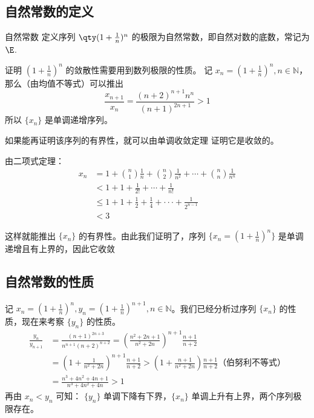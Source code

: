 

\subsection{自然常数的定义}
\begin{definition}{自然常数}
定义序列 $\qty(1+\frac{1}{n})^n$ 的极限为自然常数，即自然对数的底数，常记为$\E$.
\end{definition}
证明 $(1+\frac{1}{n})^n$ 的敛散性需要用到数列极限的性质。
记 $x_n=(1+\frac{1}{n})^n, n\in \mathbb{N}$，那么（由均值不等式）可以推出
\begin{equation}
  \frac{x_{n+1}}{x_n}=\frac{(n+2)^{n+1}n^{n}}{(n+1)^{2n+1}}>1
\end{equation}
所以 $\{x_n\}$ 是单调递增序列。

  如果能再证明该序列的有界性，就可以由单调收敛定理  证明它是收敛的。

由二项式定理：
\begin{equation}\label{eq_exp_1}
\begin{aligned}
  x_n&=1+{n\choose 1}\frac{1}{n}+{n\choose 2}\frac{1}{n^2}+\cdots+{n\choose n}\frac{1}{n^n}\\
  &<1+1+\frac{1}{2!}+\cdots+\frac{1}{n!}\\
  &\leq1+1+\frac{1}{2}+\frac{1}{4}+\cdot\cdot\cdot+\frac{1}{2^{n-1}}\\
  &<3
\end{aligned}
\end{equation}

这样就能推出 $\{x_n\}$ 的有界性。由此我们证明了，序列 $\{x_n=(1+\frac{1}{n})^n\}$ 是单调递增且有上界的，因此它收敛

  
\subsection{自然常数的性质}
  记 $x_n=(1+\frac{1}{n})^n,y_n=(1+\frac{1}{n})^{n+1}, n\in \mathbb{N}$。我们已经分析过序列 $\{x_n\}$ 的性质，现在来考察 $\{y_n\}$ 的性质。
\begin{equation}
  \begin{aligned}
  \frac{y_n}{y_{n+1}}&=\frac{(n+1)^{2n+3}}{n^{n+1}(n+2)^{n+2}}=\left(\frac{n^2+2n+1}{n^2+2n}\right)^{n+1}\frac{n+1}{n+2}\\
  &=(1+\frac{1}{n^2+2n})^{n+1}\frac{n+1}{n+2}>\left(1+\frac{n+1}{n^2+2n}\right)\frac{n+1}{n+2} \text{（伯努利不等式）}\\
  &=\frac{n^3+4n^2+4n+1}{n^3+4n^2+4n}>1
  \end{aligned}
\end{equation}
  再由 $x_n<y_n$ 可知： $\{y_n\}$ 单调下降有下界，$\{x_n\}$ 单调上升有上界，两个序列极限存在。

